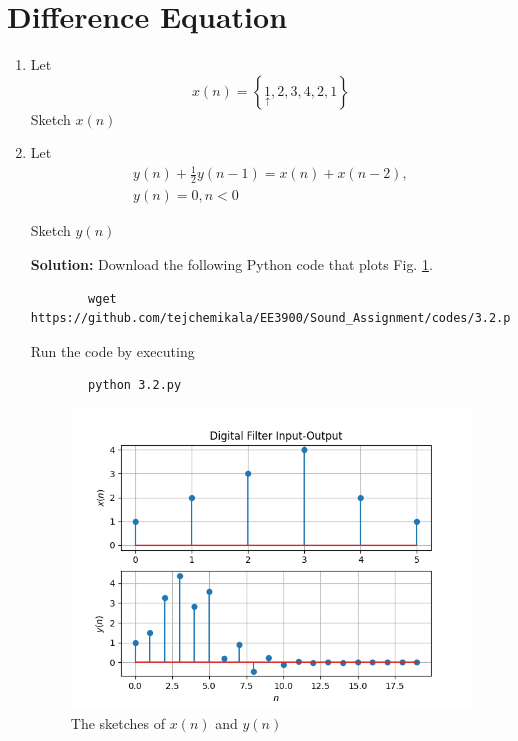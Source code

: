 \documentclass[journal,12pt,twocolumn]{IEEEtran}
\newcommand{\solution}{\noindent \textbf{Solution: }}
\providecommand{\cbrak}[1]{\ensuremath{\left\{#1\right\}}}
\numberwithin{equation}{section}
\renewcommand\thesection{\arabic{section}}
\begin{document}
	\section{Difference Equation}
	\begin{enumerate}[label=\thesection.\arabic*,ref=\thesection.\theenumi]
	\item Let
	\begin{equation}
		\label{eq:filter_input}
		x(n) = \cbrak{\underset{\uparrow}{1},2,3,4,2,1}
	\end{equation}
	Sketch $x(n)$
	\item Let
	\begin{multline}
		\label{eq:iir_filter}
		y(n) + \frac{1}{2}y(n-1) = x(n) + x(n-2), \\
 		y(n) = 0, n < 0
	\end{multline}
	
	Sketch $y(n)$

	\solution Download the following Python code that plots Fig. \ref{fig-3.2}.
	\begin{lstlisting}
		wget https://github.com/tejchemikala/EE3900/Sound_Assignment/codes/3.2.py
	\end{lstlisting}
	
	Run the code by executing
	\begin{lstlisting}
		python 3.2.py
	\end{lstlisting}

	\begin{figure}[!ht]
		\centering
		\includegraphics[width=\columnwidth]{./figs/3.2.png}
		\caption{The sketches of $x(n)$ and $y(n)$}
		\label{fig-3.2}	
	\end{figure}
	

\end{enumerate}
\end{document}
